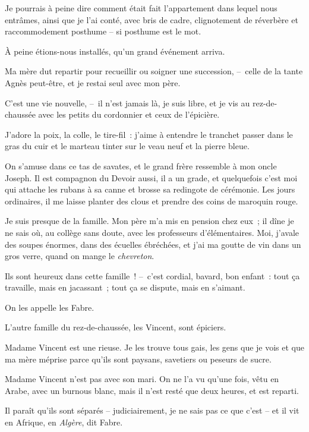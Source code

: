 \documentclass[french,twoside]{book} %
\begin{document}
\noindent Je pourrais à peine dire comment était fait l’appartement dans lequel nous entrâmes, ainsi que je l’ai conté, avec bris de cadre, clignotement de réverbère et raccommodement posthume – si posthume est le mot.\par
À peine étions-nous installés, qu’un grand événement arriva.\par
Ma mère dut repartir pour recueillir ou soigner une succession, – celle de la tante Agnès peut-être, et je restai seul avec mon père.\par
\bigbreak
\noindent C’est une vie nouvelle, – il n’est jamais là, je suis libre, et je vis au rez-de-chaussée avec les petits du cordonnier et ceux de l’épicière.\par
J’adore la poix, la colle, le tire-fil : j’aime à entendre le tranchet passer dans le gras du cuir et le marteau tinter sur le veau neuf et la pierre bleue.\par
On s’amuse dans ce tas de savates, et le grand frère ressemble à mon oncle Joseph. Il est compagnon du Devoir aussi, il a un grade, et quelquefois c’est moi qui attache les rubans à sa canne et brosse sa redingote de cérémonie. Les jours ordinaires, il me laisse planter des clous et prendre des coins de maroquin rouge.\par
Je suis presque de la famille. Mon père m’a mis en pension chez eux ; il dîne je ne sais où, au collège sans doute, avec les professeurs d’élémentaires. Moi, j’avale des soupes énormes, dans des écuelles ébréchées, et j’ai ma goutte de vin dans un gros verre, quand on mange le \emph{chevreton}.\par
Ils sont heureux dans cette famille ! – c’est cordial, bavard, bon enfant : tout ça travaille, mais en jacassant ; tout ça se dispute, mais en s’aimant.\par
On les appelle les Fabre.\par
L’autre famille du rez-de-chaussée, les Vincent, sont épiciers.\par
\bigbreak
\noindent Madame Vincent est une rieuse. Je les trouve tous gais, les gens que je vois et que ma mère méprise parce qu’ils sont paysans, savetiers ou peseurs de sucre.\par
Madame Vincent n’est pas avec son mari. On ne l’a vu qu’une fois, vêtu en Arabe, avec un burnous blanc, mais il n’est resté que deux heures, et est reparti.\par
Il paraît qu’ils sont séparés – judiciairement, je ne sais pas ce que c’est – et il vit en Afrique, en \emph{Algère}, dit Fabre.\par
\end{document}
